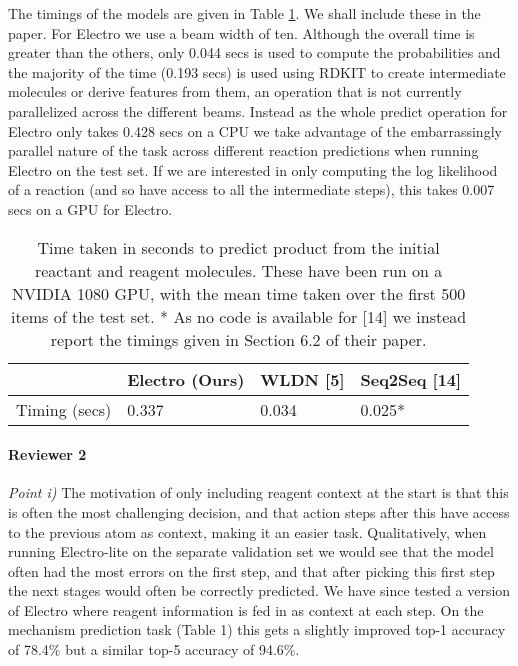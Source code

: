 \documentclass{article}
\begin{document}
The timings of the models are given in Table \ref{table:timings}. We shall include these in the paper.
 For Electro we use a beam width of ten. 
 Although the overall time is greater than the others, only 0.044 secs is used to compute the probabilities and the majority of the time (0.193 secs) is used using RDKIT to create intermediate molecules or derive features from them, an operation that is not currently parallelized across the different beams. 
 Instead as the whole predict operation for Electro only takes 0.428 secs on a CPU we take advantage of the embarrassingly parallel nature of the task across different reaction predictions when running Electro on the test set.
 If we are interested in only computing the log likelihood of a reaction (and so have access to all the intermediate steps), this takes 0.007 secs on a GPU for Electro.
 
 
 

\begin{table}[h]
  \caption{Time taken in seconds to predict product from the initial reactant and reagent molecules.
  These have been run on a NVIDIA 1080 GPU, with the mean time taken over the first 500 items of the test set.
  * As no code is available for [14] we instead report the timings given in Section 6.2 of their paper.
  }
  \label{table:timings}
  \centering
  \begin{tabular}{llll}
    \toprule
    & Electro (Ours) & WLDN [5] & Seq2Seq [14]  \\
    \midrule
    Timing (secs) & 0.337   & 0.034 &  0.025*     \\
    \bottomrule
  \end{tabular}
\end{table}




\paragraph{Reviewer 2}
\emph{Point i)}
The motivation of only including reagent context at the start is that this is often the most challenging decision, and that action steps after this have access to the previous atom as context, making it an easier task.
Qualitatively, when running Electro-lite on the separate validation set we would see that the model often had the most errors on the first step, and that after picking this first step the next stages would often be correctly predicted.
We have since tested a version of Electro where reagent information is fed in as context at each step. 
On the mechanism prediction task (Table 1) this gets a slightly improved top-1 accuracy of 78.4\% but a similar top-5 accuracy of 94.6\%.
\end{document}
